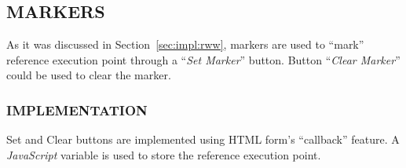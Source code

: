 \subsection{MARKERS}
As it was discussed in Section~\ref{sec:impl:rww}, markers are used to ``mark'' reference execution point through a ``{\it Set Marker}'' button. Button ``{\it Clear Marker}'' could  be used to clear the marker.

\subsubsection{IMPLEMENTATION}

Set and Clear buttons are implemented using HTML form's ``callback'' feature. A {\it JavaScript} variable is used to store the reference execution point.


